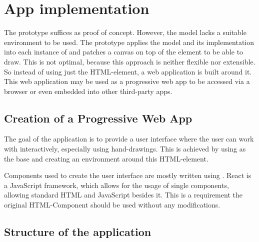 \section{App implementation} \label{ch:app_implementation}

The prototype suffices as proof of concept.
However, the model lacks a suitable environment to be used.
The prototype applies the model and its implementation into each instance of  and patches a canvas on top of the element to be able to draw.
This is not optimal, because this approach is neither flexible nor extensible.
So instead of using just the  HTML-element, a web application is built around it.
This web application may be used as a progressive web app to be accessed via a browser or even embedded into other third-party apps.

\subsection{Creation of a Progressive Web App}

The goal of the application is to provide a user interface where the user can work with  interactively, especially using hand-drawings.
This is achieved by using  as the base and creating an environment around this HTML-element.

Components used to create the user interface are mostly written using . %
React is a JavaScript framework, which allows for the usage of single components, allowing standard HTML and JavaScript besides it.
This is a requirement the original  HTML-Component should be used without any modifications.


\subsection{Structure of the application}

